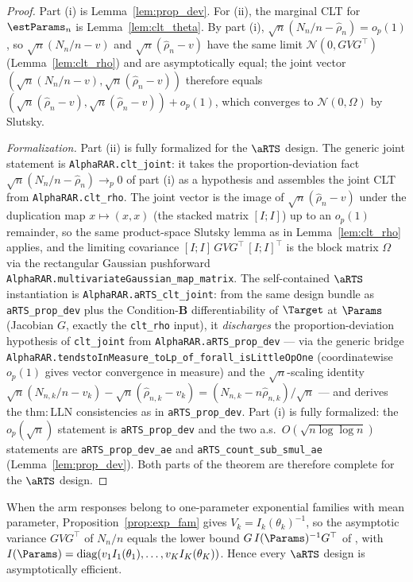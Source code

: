 \begin{proof}\leanok
{}
Part (i) is Lemma~\ref{lem:prop_dev}. For (ii), the marginal CLT for
$\estParams_n$ is Lemma~\ref{lem:clt_theta}. By part (i),
$\sqrt n(N_n/n-\hat{\rho}_n)=o_p(1)$, so $\sqrt n(N_n/n-v)$ and
$\sqrt n(\hat{\rho}_n-v)$ have the same limit $\mathcal{N}(0,GVG^\top)$
(Lemma~\ref{lem:clt_rho}) and are asymptotically equal; the joint vector
$(\sqrt n(N_n/n-v),\sqrt n(\hat{\rho}_n-v))$ therefore equals
$(\sqrt n(\hat{\rho}_n-v),\sqrt n(\hat{\rho}_n-v))+o_p(1)$, which converges to
$\mathcal{N}(0,\Omega)$ by Slutsky.

\emph{Formalization.} Part (ii) is fully formalized for the $\aRTS$ design. The generic joint
statement is \texttt{AlphaRAR.clt\_joint}: it takes the proportion-deviation fact
$\sqrt n(N_n/n-\hat{\rho}_n)\to_p 0$ of part (i) as a hypothesis and assembles the joint CLT from
\texttt{AlphaRAR.clt\_rho}. The joint vector is the image of $\sqrt n(\hat{\rho}_n-v)$ under the
duplication map $x\mapsto(x,x)$ (the stacked matrix $[I;I]$) up to an $o_p(1)$ remainder, so the
same product-space Slutsky lemma as in Lemma~\ref{lem:clt_rho} applies, and the limiting covariance
$[I;I]\,GVG^\top\,[I;I]^\top$ is the block matrix $\Omega$ via the rectangular Gaussian pushforward
\texttt{AlphaRAR.multivariateGaussian\_map\_matrix}. The self-contained $\aRTS$ instantiation is
\texttt{AlphaRAR.aRTS\_clt\_joint}: from the same design bundle as \texttt{aRTS\_prop\_dev} plus the
Condition-\textbf{B} differentiability of $\Target$ at $\Params$ (Jacobian $G$, exactly the
\texttt{clt\_rho} input), it \emph{discharges} the proportion-deviation hypothesis of
\texttt{clt\_joint} from \texttt{AlphaRAR.aRTS\_prop\_dev} --- via the generic bridge
\texttt{AlphaRAR.tendstoInMeasure\_toLp\_of\_forall\_isLittleOpOne} (coordinatewise $o_p(1)$ gives
vector convergence in measure) and the $\sqrt n$-scaling identity
$\sqrt n(N_{n,k}/n-v_k)-\sqrt n(\hat\rho_{n,k}-v_k)=(N_{n,k}-n\hat\rho_{n,k})/\sqrt n$ --- and derives
the $\mathrm{thm{:}LLN}$ consistencies as in \texttt{aRTS\_prop\_dev}. Part (i) is fully formalized:
the $o_p(\sqrt n)$ statement is \texttt{aRTS\_prop\_dev} and the two a.s.\ $O(\sqrt{n\log\log n})$
statements are \texttt{aRTS\_prop\_dev\_ae} and \texttt{aRTS\_count\_sub\_smul\_ae}
(Lemma~\ref{lem:prop_dev}). Both parts of the theorem are therefore complete for the $\aRTS$ design.
\end{proof}

\begin{remark}\label{rem:efficiency}
When the arm responses belong to one-parameter exponential families with mean
parameter, Proposition~\ref{prop:exp_fam} gives $V_k = I_k(\theta_k)^{-1}$, so the
asymptotic variance $GVG^\top$ of $N_n/n$ equals the lower bound
$G\,I(\Params)^{-1}G^\top$ of \cite{hu2006asymptotically}, with
$I(\Params)=\mathrm{diag}(v_1 I_1(\theta_1),\dots,v_K I_K(\theta_K))$. Hence every
$\aRTS$ design is asymptotically efficient.
\end{remark}


